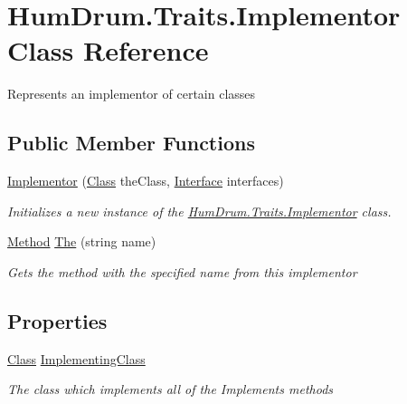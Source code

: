 \hypertarget{classHumDrum_1_1Traits_1_1Implementor}{}\section{Hum\+Drum.\+Traits.\+Implementor Class Reference}
\label{classHumDrum_1_1Traits_1_1Implementor}


Represents an implementor of certain classes  


\subsection*{Public Member Functions}
\begin{DoxyCompactItemize}
\item 
\hyperlink{classHumDrum_1_1Traits_1_1Implementor_a51f17ceb78a95ce1406441997be48122}{Implementor} (\hyperlink{classHumDrum_1_1Traits_1_1Class}{Class} the\+Class, \hyperlink{classHumDrum_1_1Traits_1_1Interface}{Interface} interfaces)
\begin{DoxyCompactList}\small\item\em Initializes a new instance of the \hyperlink{classHumDrum_1_1Traits_1_1Implementor}{Hum\+Drum.\+Traits.\+Implementor} class. \end{DoxyCompactList}\item 
\hyperlink{classHumDrum_1_1Traits_1_1Method}{Method} \hyperlink{classHumDrum_1_1Traits_1_1Implementor_aeffba2994fd0a4e8f78c266f79686297}{The} (string name)
\begin{DoxyCompactList}\small\item\em Gets the method with the specified name from this implementor \end{DoxyCompactList}\end{DoxyCompactItemize}
\subsection*{Properties}
\begin{DoxyCompactItemize}
\item 
\hyperlink{classHumDrum_1_1Traits_1_1Class}{Class} \hyperlink{classHumDrum_1_1Traits_1_1Implementor_a9e6ffcbb66e286422447ff4c983d799d}{Implementing\+Class}
\begin{DoxyCompactList}\small\item\em The class which implements all of the Implements methods \end{DoxyCompactList}\end{DoxyCompactItemize}


